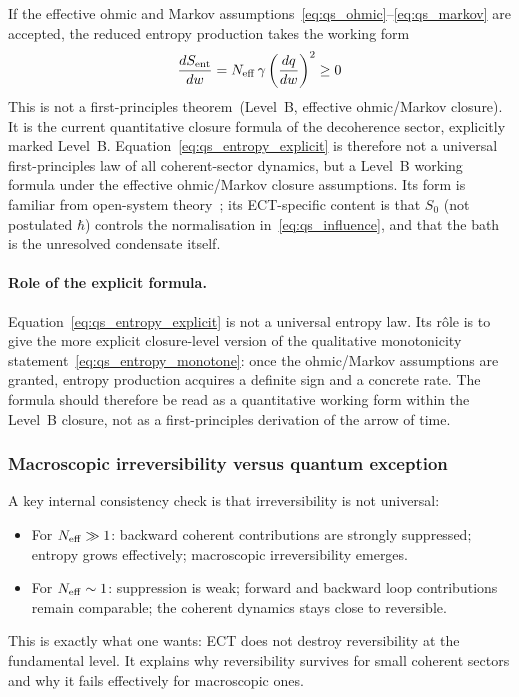 If the effective ohmic and Markov
assumptions~\eqref{eq:qs_ohmic}--\eqref{eq:qs_markov} are accepted,
the reduced entropy production takes the working form
\begin{equation}
  \label{eq:qs_entropy_explicit}
  \frac{dS_{\rm ent}}{dw}
  =
  N_{\rm eff}\,\gamma
  \left(\frac{dq}{dw}\right)^2
  \ge 0
\end{equation}
This is not a first-principles theorem~(Level~B, effective ohmic/Markov closure).
It is the current quantitative closure formula of the decoherence
sector, explicitly marked Level~B.
Equation~\eqref{eq:qs_entropy_explicit} is therefore not a universal
first-principles law of all coherent-sector dynamics, but a Level~B
working formula under the effective ohmic/Markov closure assumptions.
Its form is familiar from open-system theory~\cite{CaldeiraLeggett1983}; its
ECT-specific content is that $S_0$ (not postulated $\hbar$) controls
the normalisation in~\eqref{eq:qs_influence}, and that the bath
is the unresolved condensate itself.

\paragraph{Role of the explicit formula.}
Equation~\eqref{eq:qs_entropy_explicit} is not a universal entropy law.
Its rôle is to give the more explicit closure-level version of the
qualitative monotonicity statement~\eqref{eq:qs_entropy_monotone}:
once the ohmic/Markov assumptions are granted, entropy production
acquires a definite sign and a concrete rate.
The formula should therefore be read as a quantitative working form
within the Level~B closure, not as a first-principles derivation of
the arrow of time.

\subsubsection*{Macroscopic irreversibility versus quantum exception}

A key internal consistency check is that irreversibility is not
universal:
\begin{itemize}
  \item For $N_{\rm eff}\gg 1$: backward coherent contributions are
    strongly suppressed; entropy grows effectively; macroscopic
    irreversibility emerges.
  \item For $N_{\rm eff}\sim 1$: suppression is weak; forward and
    backward loop contributions remain comparable; the coherent
    dynamics stays close to reversible.
\end{itemize}
This is exactly what one wants: ECT does not destroy reversibility at
the fundamental level.
It explains why reversibility survives for small coherent sectors and
why it fails effectively for macroscopic ones.

